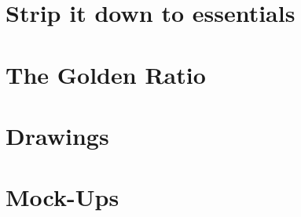 \section{Strip it down to essentials}\label{sec:design-essentials}


\section{The Golden Ratio}\label{sec:golden-ratio}

\section{Drawings}\label{sec:drawings}


\section{Mock-Ups}\label{sec:design-mockups}
